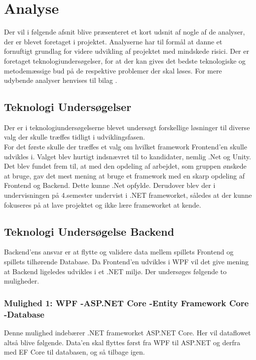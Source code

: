 \newpage
\section{Analyse}
Der vil i følgende afsnit blive præsenteret et kort udsnit af nogle af de analyser, der er blevet foretaget i projektet. Analyserne har til formål at danne et fornuftigt grundlag for videre udvikling af
projektet med mindskede risici. Der er foretaget teknologiundersøgelser, for at der kan gives det bedste teknologiske og metodemæssige bud på de respektive problemer der skal løses. For mere udybende analyser henvises til bilag \parencite[][section 6]{TekniskBilag}.

\subsection{Teknologi Undersøgelser}
Der er i teknologiundersøgelserne blevet undersøgt forskellige løsninger til diverse valg der skulle træffes tidligt i udviklingsfasen.\\
For det første skulle der træffes et valg om hvilket framework Frontend'en skulle udvikles i. Valget blev hurtigt indsnævret til to kandidater, nemlig .Net og Unity. Det blev fundet frem til, at med den 
opdeling af arbejdet, som gruppen ønskede at bruge, gav det mest mening at bruge et framework med en skarp opdeling af Frontend og Backend. 
Dette kunne .Net opfylde. Derudover blev der i undervisningen på 4.semester undervist i .NET frameworket, således at der kunne fokuseres på at lave projektet og ikke lære frameworket at kende. 


\subsection{Teknologi Undersøgelse Backend}
Backend’ens ansvar er at flytte og validere data mellem spillets Frontend og spillets tilhørende Database. Da Frontend'en udvikles i WPF vil det give mening at Backend ligeledes udvikles i et .NET miljø.
Der undersøges følgende to muligheder.\\

\subsubsection{Mulighed 1: WPF -\g ASP.NET Core -\g Entity Framework Core -\g Database}
Denne mulighed indebærer .NET frameworket ASP.NET Core. Her vil dataflowet altså blive følgende. Data’en skal flyttes først fra WPF til ASP.NET og derfra med EF Core\cite{Entity-Framework-Core} til databasen, og så tilbage igen.

